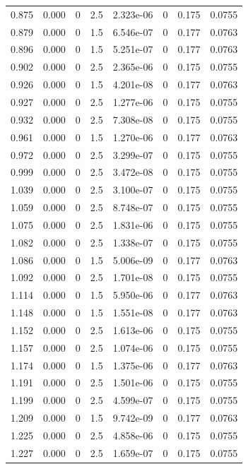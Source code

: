 \documentclass[preview]{standalone}
\begin{document}
{{{\begin{tabular}{L{1.2cm}C{1.2cm} C{0.3cm}C{0.5cm} C{1.4cm}C{1.4cm} C{1.4cm}C{1.4cm}}
  0.875  &  0.000  & 0     & 2.5 &  2.323e-06  & 0  & 0.175 &  0.0755   \\ 
  0.879  &  0.000  & 0     & 1.5 &  6.546e-07  & 0  & 0.177 &  0.0763   \\ 
  0.896  &  0.000  & 0     & 1.5 &  5.251e-07  & 0  & 0.177 &  0.0763   \\ 
  0.902  &  0.000  & 0     & 2.5 &  2.365e-06  & 0  & 0.175 &  0.0755   \\ 
  0.926  &  0.000  & 0     & 1.5 &  4.201e-08  & 0  & 0.177 &  0.0763   \\ 
  0.927  &  0.000  & 0     & 2.5 &  1.277e-06  & 0  & 0.175 &  0.0755   \\ 
  0.932  &  0.000  & 0     & 2.5 &  7.308e-08  & 0  & 0.175 &  0.0755   \\ 
  0.961  &  0.000  & 0     & 1.5 &  1.270e-06  & 0  & 0.177 &  0.0763   \\ 
  0.972  &  0.000  & 0     & 2.5 &  3.299e-07  & 0  & 0.175 &  0.0755   \\ 
  0.999  &  0.000  & 0     & 2.5 &  3.472e-08  & 0  & 0.175 &  0.0755   \\ 
  1.039  &  0.000  & 0     & 2.5 &  3.100e-07  & 0  & 0.175 &  0.0755   \\ 
  1.059  &  0.000  & 0     & 2.5 &  8.748e-07  & 0  & 0.175 &  0.0755   \\ 
  1.075  &  0.000  & 0     & 2.5 &  1.831e-06  & 0  & 0.175 &  0.0755   \\ 
  1.082  &  0.000  & 0     & 2.5 &  1.338e-07  & 0  & 0.175 &  0.0755   \\ 
  1.086  &  0.000  & 0     & 1.5 &  5.006e-09  & 0  & 0.177 &  0.0763   \\ 
  1.092  &  0.000  & 0     & 2.5 &  1.701e-08  & 0  & 0.175 &  0.0755   \\ 
  1.114  &  0.000  & 0     & 1.5 &  5.950e-06  & 0  & 0.177 &  0.0763   \\ 
  1.148  &  0.000  & 0     & 1.5 &  1.551e-08  & 0  & 0.177 &  0.0763   \\ 
  1.152  &  0.000  & 0     & 2.5 &  1.613e-06  & 0  & 0.175 &  0.0755   \\ 
  1.157  &  0.000  & 0     & 2.5 &  1.074e-06  & 0  & 0.175 &  0.0755   \\ 
  1.174  &  0.000  & 0     & 1.5 &  1.375e-06  & 0  & 0.177 &  0.0763   \\ 
  1.191  &  0.000  & 0     & 2.5 &  1.501e-06  & 0  & 0.175 &  0.0755   \\ 
  1.199  &  0.000  & 0     & 2.5 &  4.599e-07  & 0  & 0.175 &  0.0755   \\ 
  1.209  &  0.000  & 0     & 1.5 &  9.742e-09  & 0  & 0.177 &  0.0763   \\ 
  1.225  &  0.000  & 0     & 2.5 &  4.858e-06  & 0  & 0.175 &  0.0755   \\ 
  1.227  &  0.000  & 0     & 2.5 &  1.659e-07  & 0  & 0.175 &  0.0755   \\ 
\hline 
\end{tabular} 

}}}
\end{document}
